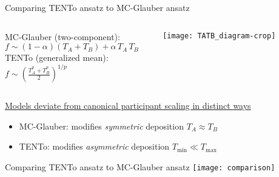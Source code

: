 \documentclass[svgnames]{beamer}
\newcommand{\trento}{T\raisebox{-.5ex}{R}ENTo}
\begin{document}
\begin{frame}{Comparing {\trento} ansatz to MC-Glauber ansatz}

\begin{columns}[T]

 \begin{column}{0.5\textwidth}
  \centering
  MC-Glauber (two-component):\\
  \vspace{0.05 in}
  $f \sim (1-\alpha) (T_A+T_B) + \alpha\, T_A\,T_B$ \\
  \vspace{0.2 in}
  {\trento} (generalized mean): \\
  \vspace{0.05 in}
  $f \sim \left(\frac{T_A^p + T_B^p}{2} \right) ^{1/p}$
 \end{column}
 
 \begin{column}{0.45\textwidth}
  \centering
  \texttt{[image: TATB\_diagram-crop]}
 \end{column}
 
 \begin{column}{0.1 in}
 \end{column}
\end{columns}

\vspace{0.3 in}

\underline{Models deviate from canonical participant scaling in distinct ways}
\begin{itemize}
 \vspace{0.1 in}
 \item MC-Glauber: modifies \emph{symmetric} deposition $T_A \approx T_B$
 \vspace{0.1 in}
 \item \trento: modifies \emph{asymmetric} deposition $T_\text{min} \ll T_\text{max}$ 
\end{itemize}

\end{frame}

\begin{frame}{Comparing {\trento} ansatz to MC-Glauber ansatz}
 \texttt{[image: comparison]}
\end{frame}
\end{document}
